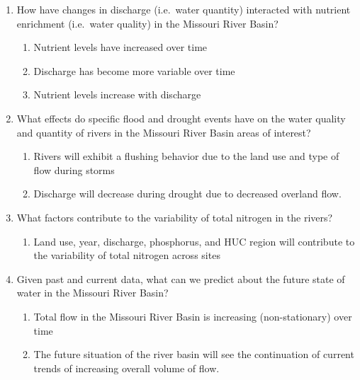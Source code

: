 \documentclass[12pt,]{article}
\providecommand{\tightlist}{%
  \setlength{\itemsep}{0pt}\setlength{\parskip}{0pt}}
\begin{document}
\begin{enumerate}
\def\labelenumi{\arabic{enumi}.}
\item
  How have changes in discharge (i.e.~water quantity) interacted with
  nutrient enrichment (i.e.~water quality) in the Missouri River Basin?

  \begin{enumerate}
  \def\labelenumii{\alph{enumii})}
  \tightlist
  \item
    Nutrient levels have increased over time
  \item
    Discharge has become more variable over time
  \item
    Nutrient levels increase with discharge
  \end{enumerate}
\item
  What effects do specific flood and drought events have on the water
  quality and quantity of rivers in the Missouri River Basin areas of
  interest?

  \begin{enumerate}
  \def\labelenumii{\alph{enumii})}
  \tightlist
  \item
    Rivers will exhibit a flushing behavior due to the land use and type
    of flow during storms
  \item
    Discharge will decrease during drought due to decreased overland
    flow.
  \end{enumerate}
\item
  What factors contribute to the variability of total nitrogen in the
  rivers?

  \begin{enumerate}
  \def\labelenumii{\alph{enumii})}
  \tightlist
  \item
    Land use, year, discharge, phosphorus, and HUC region will
    contribute to the variability of total nitrogen across sites
  \end{enumerate}
\item
  Given past and current data, what can we predict about the future
  state of water in the Missouri River Basin?

  \begin{enumerate}
  \def\labelenumii{\alph{enumii})}
  \tightlist
  \item
    Total flow in the Missouri River Basin is increasing
    (non-stationary) over time
  \item
    The future situation of the river basin will see the continuation of
    current trends of increasing overall volume of flow.
  \end{enumerate}
\end{enumerate}
\end{document}
